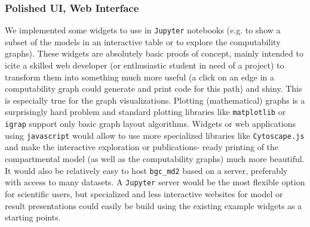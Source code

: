 \subsubsection{Polished UI, Web Interface}
We implemented some widgets to use in \texttt{Jupyter} notebooks (e.g. to show a subset
of the models in an interactive table or to explore the computability graphs).
These widgets are absolutely basic  proofs of concept, mainly intended to icite a skilled web developer 
(or enthusiastic student in need of a project) to transform them into something much
more useful (a click on an edge in a computability graph could generate and print code for this path) and shiny.
This is especially true for the graph visualizations. 
Plotting (mathematical) graphs is a surprisingly hard problem and
standard plotting libraries like \texttt{matplotlib} or
\texttt{igrap} support only basic graph layout algorithms.  
Widgets or web applications using \texttt{javascript} would allow to use more specialized libraries like \texttt{Cytoscape.js} 
and make the interactive exploration or publications- ready printing of the compartmental model (as well as the computability graphs) 
much more beautiful. 
It would also be relatively easy to host \texttt{bgc\_md2} based on a server, preferably with access to many datasets.
A \texttt{Jupyter} server would be the most flexible option for scientific users, 
but specialized and less interactive websites for model or result presentations could 
easily be build using the existing example widgets as a starting points. 






